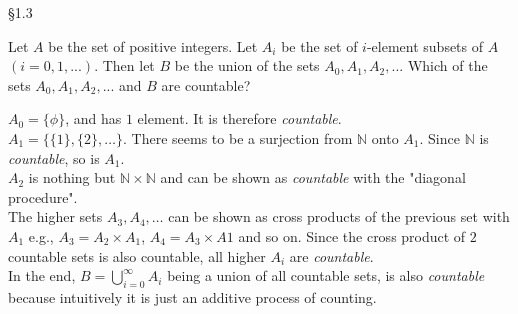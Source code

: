 \documentclass[boxes, qed]{homework}
\begin{document}
\newenvironment{amatrix}[1]{%
  \left[\begin{array}{@{}*{#1}{c}|c@{}}
}{%
  \end{array}\right]
}

\newenvironment{augmatrix}[1]{%
  \left[\begin{array}{#1}
}{%
  \end{array}\right]
}

\S1.3
\begin{problem}
  Let $A$ be the set of positive integers. Let $A_i$ be the set of $i$-element subsets of $A$ $(i=0,1,...)$.
  Then let $B$ be the union of the sets $A_0, A_1, A_2, ...$
  Which of the sets $A_0, A_1, A_2,...$ and $B$ are countable?
\end{problem}
\begin{solution}
  $A_0=\{\phi\}$, and has $1$ element. It is therefore \textit{countable}.\\
  $A_1=\{\{1\},\{2\},\dots\}$. There seems to be a surjection from $\mathbb{N}$
  onto $A_1$. Since $\mathbb{N}$ is \textit{countable}, so is $A_1$.\\
  $A_2$ is nothing but $\mathbb{N}\times\mathbb{N}$ and can be shown as 
  \textit{countable} with the "diagonal procedure".\\
  The higher sets $A_3,A_4,\dots$ can be shown as
  cross products of the previous set with $A_1$ 
  e.g., $A_3=A_2\times{A_1}$, $A_4=A_3\times{A1}$ and so on.
  Since the cross product of $2$ countable sets is also countable,
  all higher $A_i$ are \textit{countable}.\\

  In the end, $B=\bigcup_{i=0}^{\infty}A_i$ being a union
  of all countable sets, is also \textit{countable} because
  intuitively it is just an additive process of counting.
\end{solution}
\end{document}
